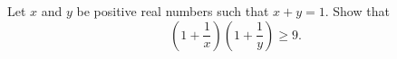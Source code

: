 Let $x$ and $y$ be positive real numbers such that $x+y=1$. Show that \[ \left(1+\frac{1}{x}\right)\left(1+\frac{1}{y}\right)\ge 9. \]